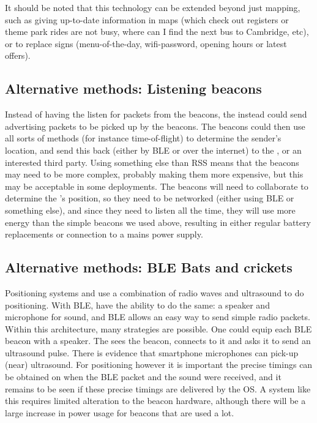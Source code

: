 It should be noted that this technology can be extended beyond just mapping, such as giving up-to-date information in maps (which check out registers or theme park rides are not busy, where can I find the next bus to Cambridge, etc), or to replace signs (menu-of-the-day, wifi-password, opening hours or latest offers). 


\subsection{Alternative methods: Listening beacons}
Instead of having the \device listen for packets from the beacons, the \device instead could send advertising packets to be picked up by the beacons.
The beacons could then use all sorts of methods (for instance time-of-flight) to determine the sender's location, and send this back (either by BLE or over the internet) to the \device, or an interested third party.
Using something else than RSS means that the beacons may need to be more complex, probably making them more expensive, but this may be acceptable in some deployments.
The beacons will need to collaborate to determine the \device's position, so they need to be networked (either using BLE or something else), and since they need to listen all the time, they will use more energy than the simple beacons we used above, resulting in either regular battery replacements or connection to a mains power supply.

\subsection{Alternative methods: BLE Bats and crickets}
\label{sec:architecture-bats}
Positioning systems \citep{harter2002anatomy} and \citep{priyantha2000cricket} use a combination of radio waves and ultrasound to do positioning.
With BLE, \device have the ability to do the same: a speaker and microphone for sound, and BLE allows \apps an easy way to send simple radio packets.
Within this architecture, many strategies are possible.
One could equip each BLE beacon with a speaker.
The \device sees the beacon, connects to it and asks it to send an ultrasound pulse.
There is evidence that smartphone microphones can pick-up (near) ultrasound\citep{arentz2011near,bihler2011smartguide}.
For positioning however it is important the precise timings can be obtained on when the BLE packet and the sound were received, and it remains to be seen if these precise timings are delivered by the OS.
A system like this requires limited alteration to the beacon hardware, although there will be a large increase in power usage for beacons that are used a lot.
